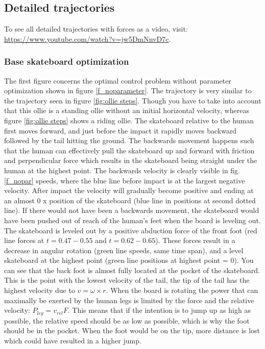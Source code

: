 \documentclass[default,iicol]{sn-jnl}
\begin{document}
\subsection{Detailed trajectories}
To see all detailed trajectories with forces as a video, visit: \url{https://www.youtube.com/watch?v=jw5DmNnvD7c}.

\subsubsection{Base skateboard optimization}

\noindent The first figure concerns the optimal control problem without parameter optimization shown in figure \ref{f_noparameter}. The trajectory is very similar to the trajectory seen in figure \ref{fig:ollie steps}. Though you have to take into account that this ollie is a standing ollie without an initial horizontal velocity, whereas figure \ref{fig:ollie steps} shows a riding ollie. The skateboard relative to the human first moves forward, and just before the impact it rapidly moves backward followed by the tail hitting the ground. The backwards movement happens such that the human can effectively pull the skateboard up and forward with friction and perpendicular force which results in the skateboard being straight under the human at the highest point. The backwards velocity is clearly visible in fig. \ref{f_nopar} speeds, where the blue line before impact is at the largest negative velocity. After impact the velocity will gradually become positive and ending at an almost 0 x position of the skateboard (blue line in positions at second dotted line). If there would not have been a backwards movement, the skateboard would have been pushed out of reach of the human's feet when the board is leveling out. The skateboard is leveled out by a positive abduction force of the front foot (red line forces at $t=0.47-0.55$ and $t=0.62-0.65$). These forces result in a decrease in angular rotation (green line speeds, same time span), and a level skateboard at the highest point (green line positions at highest point = 0).
You can see that the back foot is almost fully located at the pocket of the skateboard. This is the point with the lowest velocity of the tail, the tip of the tail has the highest velocity due to $v = \omega \times r$. When the board is rotating the power that can maximally be exerted by the human legs is limited by the force and the relative velocity: $P_{leg} = v_{rel} F$. This means that if the intention is to jump up as high as possible, the relative speed should be as low as possible, which is why the foot should be in the pocket. When the foot would be on the tip, more distance is lost which could have resulted in a higher jump. 
\end{document}
